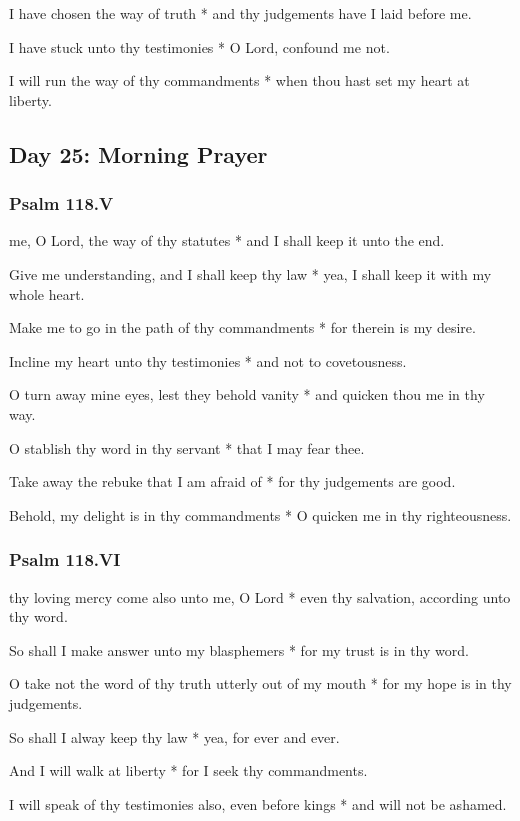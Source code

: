 I have chosen the way of truth * and thy judgements have I laid before me.

I have stuck unto thy testimonies * O Lord, confound me not.

I will run the way of thy commandments * when thou hast set my heart at liberty.

\subsection{Day 25: Morning Prayer}

\subsubsection{Psalm 118.V}

 me, O Lord, the way of thy statutes * and I shall keep it unto the end.

Give me understanding, and I shall keep thy law * yea, I shall keep it with my whole heart.

Make me to go in the path of thy commandments * for therein is my desire.

Incline my heart unto thy testimonies * and not to covetousness.

O turn away mine eyes, lest they behold vanity * and quicken thou me in thy way.

O stablish thy word in thy servant * that I may fear thee.

Take away the rebuke that I am afraid of * for thy judgements are good.

Behold, my delight is in thy commandments * O quicken me in thy righteousness.

\subsubsection{Psalm 118.VI}

 thy loving mercy come also unto me, O Lord * even thy salvation, according unto thy word.

So shall I make answer unto my blasphemers * for my trust is in thy word.

O take not the word of thy truth utterly out of my mouth * for my hope is in thy judgements.

So shall I alway keep thy law * yea, for ever and ever.

And I will walk at liberty * for I seek thy commandments.

I will speak of thy testimonies also, even before kings * and will not be ashamed.

